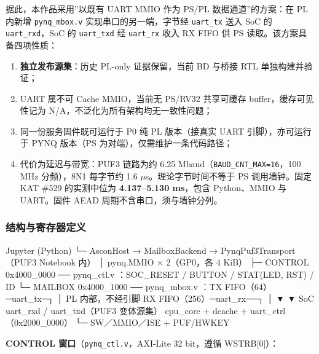 据此，本作品采用''以既有 UART MMIO 作为 PS/PL 数据通道''的方案：在 PL 内新增 \texttt{pynq\_\allowbreak{}mbox.\allowbreak{}v} 实现串口的另一端，字节经 \texttt{uart\_\allowbreak{}tx} 送入 SoC 的 \texttt{uart\_\allowbreak{}rxd}，SoC 的 \texttt{uart\_\allowbreak{}txd} 经 \texttt{uart\_\allowbreak{}rx} 收入 RX FIFO 供 PS 读取。该方案具备四项性质：

\begin{enumerate}
\def\labelenumi{\arabic{enumi}.}
\tightlist
\item
  \textbf{独立发布源集}：历史 PL-only 证据保留，当前 BD 与桥接 RTL 单独构建并验证；
\item
  UART 属不可 Cache MMIO，当前无 PS/RV32 共享可缓存 buffer，缓存可见性记为 N/A，不泛化为所有架构均无一致性问题；
\item
  同一份服务固件既可运行于 P0 纯 PL 版本（接真实 UART 引脚），亦可运行于 PYNQ 版本（PS 为对端），仅需维护一条代码路径；
\item
  代价为延迟与带宽：PUF3 链路为约 6.25 Mbaud（\texttt{BAUD\_CNT\_MAX=16}，100 MHz 分频），8N1 每字节约 1.6 $\mu$s。理论字节时间不等于 PS 调用墙钟。固定 KAT \#529 的实测中位为 \textbf{4.137--5.130 ms}，包含 Python、MMIO 与 UART。固件 AEAD 周期不含串口，须与墙钟分列。
\end{enumerate}

\Needspace{170pt}

\subsubsection{结构与寄存器定义}

\begin{codeblock}[samepage=true]
Jupyter (Python)
  └─ AsconHost → MailboxBackend → PynqPuf3Transport（PUF3 Notebook 内）
        │  pynq.MMIO × 2（GP0，各 4 KiB）
        ├─ CONTROL 0x4000_0000 ── pynq_ctl.v  ：SOC_RESET / BUTTON / STAT(LED, RST) / ID
        └─ MAILBOX 0x4000_1000 ── pynq_mbox.v ：TX FIFO（64）─uart_tx─┐
                                                                     │ PL 内部，不经引脚
                                        RX FIFO（256）─uart_rx──┐    │
                                                               ▼    ▼
                                            SoC uart_rxd / uart_txd（PUF3 变体源集）
                                              cpu_core + dcache + uart_ctrl（0x2000_0000）
                                                        └─ SW／MMIO／ISE + PUF/HWKEY
\end{codeblock}

\textbf{CONTROL 窗口}（\texttt{pynq\_\allowbreak{}ctl.\allowbreak{}v}，AXI-Lite 32 bit，遵循 WSTRB{[}0{]}）：

